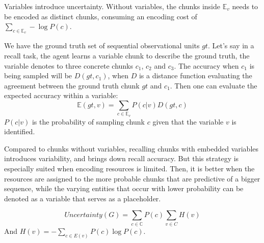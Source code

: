 \documentclass{article} %
\theoremstyle{remark}
\begin{document}
Variables introduce uncertainty. 
Without variables, the chunks inside $\mathbb{E}_{v}$ needs to be encoded as distinct chunks, consuming an encoding cost of $\sum_{c \in \mathbb{E}_v} -\log P(c)$. 

We have the ground truth set of sequential observational units $gt$. Let's say in a recall task, the agent learns a variable chunk to describe the ground truth, the variable denotes to three concrete chunks $c_1$, $c_2$ and $c_3$. The accuracy when $c_1$ is being sampled will be $D(gt, c_1)$, when $D$ is a distance function evaluating the agreement between the ground truth chunk $gt$ and $c_1$. Then one can evaluate the expected accuracy within a variable:
\begin{equation}
    \mathbb{E}(gt, v) = \sum_{c\in \mathbb{E}_v}{P(c|v)D(gt,c)}
\end{equation}
$P(c|v)$ is the probability of sampling chunk $c$ given that the variable $v$ is identified. 

Compared to chunks without variables, recalling chunks with embedded variables introduces variability, and brings down recall accuracy.
But this strategy is especially suited when encoding resources is limited. Then, it is better when the resources are assigned to the more probable chunks that are predictive of a bigger sequence, while the varying entities that occur with lower probability can be denoted as a variable that serves as a placeholder. 

\begin{equation}
    Uncertainty(G) = \sum_{c \in \mathbb{C}} P(c) \sum_{ v\in C} H(v) 
\end{equation}
And $H(v) = -\sum_{c \in E(v)}P(c)\log{P(c)}$. 

\end{document}

